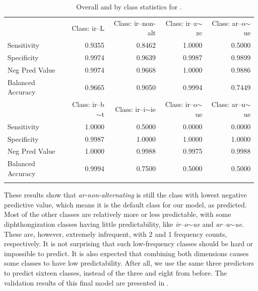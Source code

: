 \begin{table}[!htpb]
\begin{tabular}{lrrrr}
 & Class: ir--L &Class: ir--non-alt& Class: ir--z$\sim$zc& Class: ar--o$\sim$ue\\

    Sensitivity         &       0.9355 &            0.8462&          1.0000&          0.5000\\
    Specificity         &       0.9974 &            0.9639&          0.9987&          0.9899\\
    Neg Pred Value      &       0.9974 &            0.9668&          1.0000&          0.9886\\
    Balanced Accuracy   &       0.9665 &            0.9050&          0.9994&          0.7449\\

 &Class: ir--b$\sim$t& Class: ir--i$\sim$ie& Class: ir--o$\sim$ue& Class: ar--u$\sim$ue\\

    Sensitivity          &         1.0000&          0.5000&          0.0000&          0.0000\\
    Specificity          &         0.9987&          1.0000&          1.0000&          1.0000\\
    Neg Pred Value       &         1.0000&          0.9988&          0.9975&          0.9988\\
    Balanced Accuracy    &         0.9994&          0.7500&          0.5000&          0.5000\\
    \lspbottomrule
\end{tabular}
  \caption{Overall and by class statistics for .}
  \label{tab:spanish-verbs-class-v-stats}
\end{table}

These results show that \textit{ar-non-alternating} is still the class with lowest negative predictive value, which means it is the default class for our model, as predicted. Most of the other classes are relatively more or less predictable, with some diphthongization classes having little predictability, like \textit{ir--o$\sim$ue} and \textit{ar--u$\sim$ue}. These are, however, extremely infrequent, with 2 and 1 frequency counts, respectively. It is not surprising that such low-frequency classes should be hard or impossible to predict. It is also expected that combining both dimensions causes some classes to have low predictability. After all, we use the same three predictors to predict sixteen classes, instead of the three and eight from before. The validation results of this final model are presented in .%

